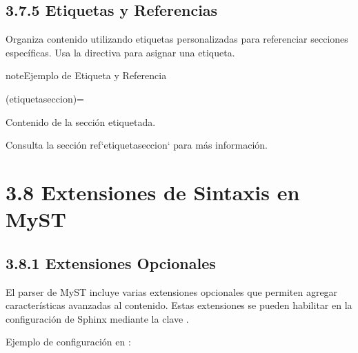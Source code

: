 \documentclass[a4paper,10pt,spanish]{sphinxmanual}
\begin{document}
\subsection{3.7.5 Etiquetas y Referencias}
\label{\detokenize{3_guia_myst/organizacion_contenido:etiquetas-y-referencias}}
\sphinxAtStartPar
Organiza contenido utilizando etiquetas personalizadas para referenciar secciones específicas. Usa la directiva  para asignar una etiqueta.

\begin{sphinxadmonition}{note}{Ejemplo de Etiqueta y Referencia}

\begin{sphinxVerbatim}[commandchars=\\\{\}]
(etiqueta\PYGZhy{}seccion)=

Contenido de la sección etiquetada.

Consulta la sección \PYGZob{}ref\PYGZcb{}`etiqueta\PYGZhy{}seccion` para más información.
\end{sphinxVerbatim}
\end{sphinxadmonition}

\sphinxstepscope


\section{3.8 Extensiones de Sintaxis en MyST}
\label{\detokenize{3_guia_myst/extensiones:extensiones-de-sintaxis-en-myst}}\label{\detokenize{3_guia_myst/extensiones::doc}}

\subsection{3.8.1 Extensiones Opcionales}
\label{\detokenize{3_guia_myst/extensiones:extensiones-opcionales}}
\sphinxAtStartPar
El parser de MyST incluye varias extensiones opcionales que permiten agregar características avanzadas al contenido. Estas extensiones se pueden habilitar en la configuración de Sphinx mediante la clave .

\sphinxAtStartPar
Ejemplo de configuración en :

\begin{sphinxVerbatim}[commandchars=\\\{\}]
  \PYG{p}{[}
\PYG{p}{]}
\end{sphinxVerbatim}
\end{document}
